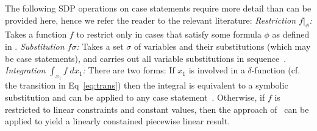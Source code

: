 \documentclass{article} %
\begin{document}
The following SDP operations on case statements require more detail than can be provided here, hence we refer the reader to the relevant literature:
{\it Restriction $f|_{\phi}$:}  Takes a function $f$ to restrict only in cases
that satisfy some formula $\phi$ as defined in \cite{sanner_uai11}.
{\it Substitution $f\sigma$:} Takes a set $\sigma$ of variables and their substitutions (which may be case statements), and carries out all variable substitutions in sequence~\cite{sanner_uai11}.
{\it Integration $\int_{x_1} f \; dx_1$:}  There are two forms: If $x_1$ is involved in a $\delta$-function (cf. the transition in Eq~\eqref{eq:trans}) then the integral is equivalent to a symbolic substitution and can be applied to any case statement~\cite{sanner_uai11}. Otherwise, if $f$ is restricted to linear constraints and constant values, then the approach of~\cite{sanner_aaai12} can be applied to yield a linearly constained piecewise linear result.
\end{document}
